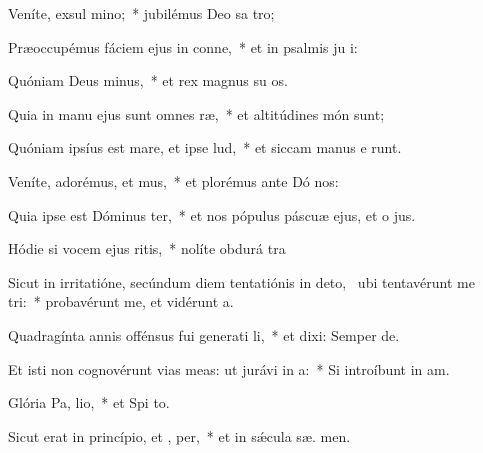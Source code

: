 \item Veníte, exsul mino;~* jubilémus Deo sa tro;
\item Præoccupémus fáciem ejus in conne,~* et in psalmis ju i:
\item Quóniam Deus  minus,~* et rex magnus su  os.
\item Quia in manu ejus sunt omnes  ræ,~* et altitúdines món  sunt;
\item Quóniam ipsíus est mare, et ipse  lud,~* et siccam manus e runt.
\item Veníte, adorémus, et mus,~* et plorémus ante Dó   nos:
\item Quia ipse est Dóminus  ter,~* et nos pópulus páscuæ ejus, et o  jus.
\item Hódie si vocem ejus ritis,~* nolíte obdurá  tra
\item Sicut in irritatióne, secúndum diem tentatiónis in deto,~\pscross{} ubi tentavérunt me  tri:~* probavérunt me, et vidérunt  a.
\item Quadragínta annis offénsus fui generati li,~* et dixi: Semper   de.
\item Et isti non cognovérunt vias meas: ut jurávi in  a:~* Si introíbunt in  am.
\item Glória Pa,  lio,~* et Spi to.
\item Sicut erat in princípio, et ,  per,~* et in sǽcula sæ. men.
